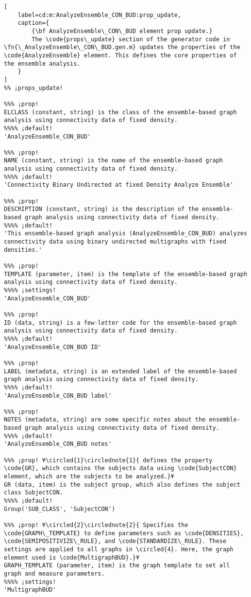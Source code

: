 \documentclass{tufte-handout}
\begin{document}
\begin{lstlisting}[
	label=cd:m:AnalyzeEnsemble_CON_BUD:prop_update,
	caption={
		{\bf AnalyzeEnsemble\_CON\_BUD element prop update.}
		The \code{props\_update} section of the generator code in \fn{\_AnalyzeEnsemble\_CON\_BUD.gen.m} updates the properties of the \code{AnalyzeEnsemble} element. This defines the core properties of the ensemble analysis.
	}
]
%% ¡props_update!

%%% ¡prop!
ELCLASS (constant, string) is the class of the ensemble-based graph analysis using connectivity data of fixed density.
%%%% ¡default!
'AnalyzeEnsemble_CON_BUD'

%%% ¡prop!
NAME (constant, string) is the name of the ensemble-based graph analysis using connectivity data of fixed density.
%%%% ¡default!
'Connectivity Binary Undirected at fixed Density Analyze Ensemble'

%%% ¡prop!
DESCRIPTION (constant, string) is the description of the ensemble-based graph analysis using connectivity data of fixed density.
%%%% ¡default!
'This ensemble-based graph analysis (AnalyzeEnsemble_CON_BUD) analyzes connectivity data using binary undirected multigraphs with fixed densities.'

%%% ¡prop!
TEMPLATE (parameter, item) is the template of the ensemble-based graph analysis using connectivity data of fixed density.
%%%% ¡settings!
'AnalyzeEnsemble_CON_BUD'

%%% ¡prop!
ID (data, string) is a few-letter code for the ensemble-based graph analysis using connectivity data of fixed density.
%%%% ¡default!
'AnalyzeEnsemble_CON_BUD ID'

%%% ¡prop!
LABEL (metadata, string) is an extended label of the ensemble-based graph analysis using connectivity data of fixed density.
%%%% ¡default!
'AnalyzeEnsemble_CON_BUD label'

%%% ¡prop!
NOTES (metadata, string) are some specific notes about the ensemble-based graph analysis using connectivity data of fixed density.
%%%% ¡default!
'AnalyzeEnsemble_CON_BUD notes'

%%% ¡prop! ¥\circled{1}\circlednote{1}{ defines the property \code{GR}, which contains the subjects data using \code{SubjectCON} element, which are the subjects to be analyzed.}¥
GR (data, item) is the subject group, which also defines the subject class SubjectCON.
%%%% ¡default!
Group('SUB_CLASS', 'SubjectCON')

%%% ¡prop! ¥\circled{2}\circlednote{2}{ Specifies the \code{GRAPH\_TEMPLATE} to define parameters such as \code{DENSITIES}, \code{SEMIPOSITIVIZE\_RULE}, and \code{STANDARDIZE\_RULE}. These settings are applied to all graphs in \circled{4}. Here, the graph element used is \code{MultigraphBUD}.}¥
GRAPH_TEMPLATE (parameter, item) is the graph template to set all graph and measure parameters.
%%%% ¡settings!
'MultigraphBUD'


\end{lstlisting}
\end{document}
